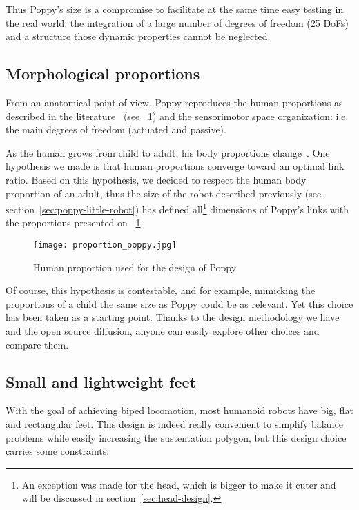 Thus Poppy's size is a compromise to facilitate at the same time easy testing in the real world, the integration of a large number of degrees of freedom (25 DoFs) and a structure those dynamic properties cannot be neglected.

\subsection{Morphological proportions} %

From an anatomical point of view, Poppy reproduces the human proportions as described in the literature~\parencite{dufour2005biomecanique} (see \figurename~\ref{fig:poppy-human-proportion}) and the sensorimotor space organization: i.e. the main degrees of freedom (actuated and passive).

As the human grows from child to adult, his body proportions change~\parencite{bogin2010leg}. One hypothesis we made is that human proportions converge toward an optimal link ratio. Based on this hypothesis, we decided to respect the human body proportion of an adult, thus the size of the robot described previously (see section~\ref{sec:poppy-little-robot}) has defined all\footnote{An exception was made for the head, which is bigger to make it cuter and will be discussed in section~\ref{sec:head-design}.} dimensions  of Poppy's links with the proportions presented on \figurename~\ref{fig:poppy-human-proportion}.

\begin{figure}[tb]
    \centering
        \texttt{[image: proportion\_poppy.jpg]}
    \caption{Human proportion used for the design of Poppy~\parencite{dufour2005biomecanique}}
    \label{fig:poppy-human-proportion}
\end{figure}

Of course, this hypothesis is contestable, and for example, mimicking the proportions of a child the same size as Poppy could be as relevant. Yet this choice has been taken as a starting point. Thanks to the design methodology we have and the open source diffusion, anyone can easily explore other choices and compare them.

\subsection{Small and lightweight feet} %

With the goal of achieving biped locomotion, most humanoid robots have big, flat and rectangular feet. This design is indeed really convenient to simplify balance problems while easily increasing the sustentation polygon, but this design choice carries some constraints:

